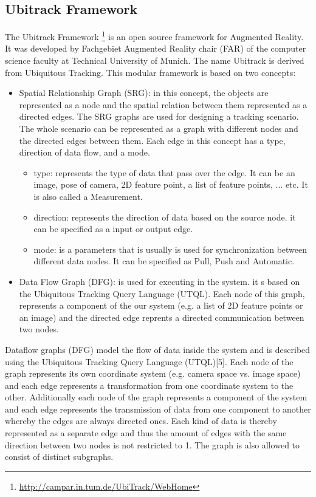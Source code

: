 \subsection{Ubitrack Framework} \label{sebsec:ubitrack}
The Ubitrack Framework \footnote {\url{http://campar.in.tum.de/UbiTrack/WebHome}} is an open source framework for Augmented Reality. It was developed by Fachgebiet Augmented Reality chair (FAR) of the computer science faculty at Technical University of Munich. The name Ubitrack is derived from Ubiquitous Tracking. This modular framework is based on two concepts:
\begin{itemize} 
\item Spatial Relationship Graph (SRG): in this concept, the objects are represented as a node and the spatial relation between them represented as a directed edges. The SRG graphs are used for designing a tracking scenario. The whole scenario can be represented as a graph with different nodes and the directed edges between them. Each edge in this concept has a type, direction of data flow, and a mode. 
	\begin{itemize}
		\item type: represents the type of data that pass over the edge. It can be an image, pose of camera, 2D feature point, a list of feature points, ... etc. It is also called a Measurement.
		\item direction: represents the direction of data based on the source node. it can be specified as a input or output edge.
		\item mode: is a parameters that is usually is used for synchronization between different data nodes. It can be specified as Pull, Push and Automatic.
	\end{itemize}
\item Data Flow Graph (DFG): is used for executing in the system. it s based on the Ubiquitous Tracking Query Language (UTQL). Each node of this graph, represents a component of the our system (e.g. a list of 2D feature points or an image) and the directed edge reprents a directed communication between two nodes. 
\end{itemize}


Dataflow graphs (DFG) model the flow of data inside the system and is described using the Ubiquitous Tracking Query Language (UTQL)[5]. Each node of the graph represents its own coordinate system (e.g. camera space vs. image space) and each edge represents a transformation from one coordinate system to the other. Additionally each node of the graph represents a component of the system and each edge represents the transmission of data from one component to another whereby the edges are always directed ones. Each kind of data is thereby represented as a separate edge and thus the amount of edges with the same direction between two nodes is not restricted to 1. The graph is also allowed to consist of distinct subgraphs.

